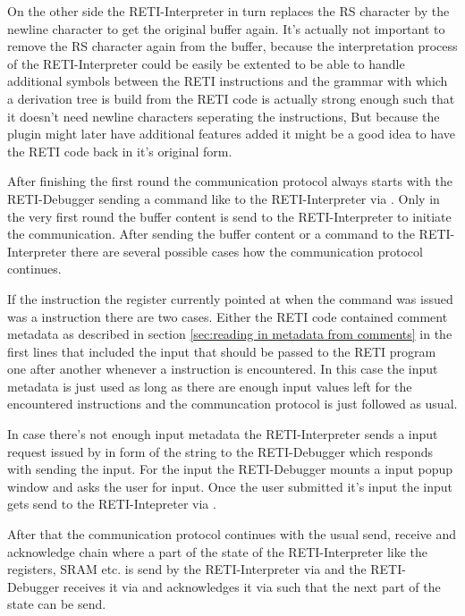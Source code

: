 \documentclass{report}
\begin{document}
On the other side the RETI-Interpreter in turn replaces the RS character  by the newline character  to get the original buffer again. It's actually not important to remove the RS character again from the buffer, because the interpretation process of the RETI-Interpreter could be easily be extented to be able to handle additional symbols between the RETI instructions and the grammar with which a derivation tree is build from the RETI code is actually strong enough such that it doesn't need newline characters  seperating the instructions, But because the plugin might later have additional features added it might be a good idea to have the RETI code back in it's original form.

After finishing the first round the communication protocol always starts with the RETI-Debugger sending a command like  to the RETI-Interpreter via . Only in the very first round the buffer content is send to the RETI-Interpreter to initiate the communication. After sending the buffer content or a command to the RETI-Interpreter there are several possible cases how the communication protocol continues.

If the instruction the  register currently pointed at when the  command was issued was a  instruction there are two cases. Either the RETI code contained \alert{comment metadata} as described in section \ref{sec:reading in metadata from comments} in the first lines that included the input that should be passed to the RETI program one after another whenever a  instruction is encountered. In this case the input metadata is just used as long as there are enough input values left for the encountered  instructions and the communcation protocol is just followed as usual.

In case there's not enough input metadata the RETI-Interpreter sends a input request issued by  in form of the string  to the RETI-Debugger which responds with sending the input. For the input the RETI-Debugger mounts a input popup window and asks the user for input. Once the user submitted it's input the input gets send to the RETI-Intepreter via .

After that the communication protocol continues with the usual send, receive and acknowledge chain where a part of the state of the RETI-Interpreter like the registers, SRAM etc. is send by the RETI-Interpreter via  and the RETI-Debugger receives it via  and acknowledges it via  such that the next part of the state can be send. 
\end{document}
